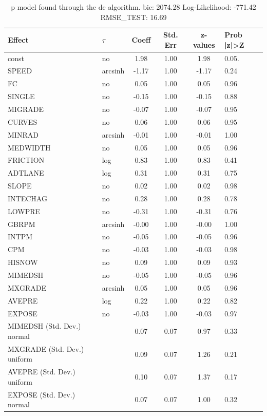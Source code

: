 \begin{table}
	\caption{p model found through the de algorithm. bic: 2074.28 Log-Likelihood: -771.42 RMSE_TEST: 16.69}
	\begin{center}
		\begin{tabular}{|l|l|c|c|c|l|}
			\hline
			Effect & $\tau$ & Coeff & Std. Err & z-values & Prob |z|>Z \\
			\hline
			const & no & 1.98 & 1.00 & 1.98 & 0.05. \\
			\hline
			SPEED & arcsinh & -1.17 & 1.00 & -1.17 & 0.24 \\
			\hline
			FC & no & 0.05 & 1.00 & 0.05 & 0.96 \\
			\hline
			SINGLE & no & -0.15 & 1.00 & -0.15 & 0.88 \\
			\hline
			MIGRADE & no & -0.07 & 1.00 & -0.07 & 0.95 \\
			\hline
			CURVES & no & 0.06 & 1.00 & 0.06 & 0.95 \\
			\hline
			MINRAD & arcsinh & -0.01 & 1.00 & -0.01 & 1.00 \\
			\hline
			MEDWIDTH & no & 0.05 & 1.00 & 0.05 & 0.96 \\
			\hline
			FRICTION & log & 0.83 & 1.00 & 0.83 & 0.41 \\
			\hline
			ADTLANE & log & 0.31 & 1.00 & 0.31 & 0.75 \\
			\hline
			SLOPE & no & 0.02 & 1.00 & 0.02 & 0.98 \\
			\hline
			INTECHAG & no & 0.28 & 1.00 & 0.28 & 0.78 \\
			\hline
			LOWPRE & no & -0.31 & 1.00 & -0.31 & 0.76 \\
			\hline
			GBRPM & arcsinh & -0.00 & 1.00 & -0.00 & 1.00 \\
			\hline
			INTPM & no & -0.05 & 1.00 & -0.05 & 0.96 \\
			\hline
			CPM & no & -0.03 & 1.00 & -0.03 & 0.98 \\
			\hline
			HISNOW & no & 0.09 & 1.00 & 0.09 & 0.93 \\
			\hline
			MIMEDSH & no & -0.05 & 1.00 & -0.05 & 0.96 \\
			\hline
			MXGRADE & arcsinh & 0.05 & 1.00 & 0.05 & 0.96 \\
			\hline
			AVEPRE & log & 0.22 & 1.00 & 0.22 & 0.82 \\
			\hline
			EXPOSE & no & -0.03 & 1.00 & -0.03 & 0.97 \\
			\hline
			MIMEDSH (Std. Dev.) normal &  & 0.07 & 0.07 & 0.97 & 0.33 \\
			\hline
			MXGRADE (Std. Dev.) uniform &  & 0.09 & 0.07 & 1.26 & 0.21 \\
			\hline
			AVEPRE (Std. Dev.) uniform &  & 0.10 & 0.07 & 1.37 & 0.17 \\
			\hline
			EXPOSE (Std. Dev.) normal &  & 0.07 & 0.07 & 1.00 & 0.32 \\
			\hline
		\end{tabular}
	\end{center}
\end{table}